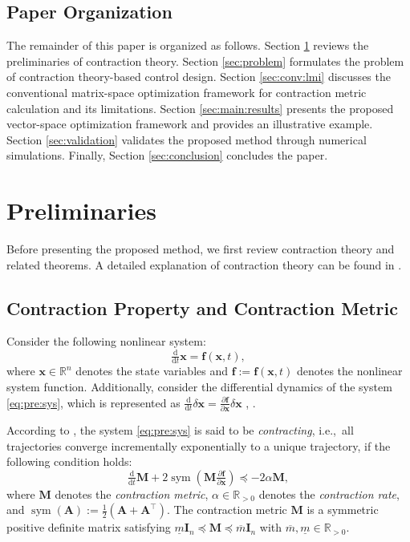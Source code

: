 \documentclass{ifacconf}
\newcommand\ie{\textrm{i.e.,\ }}
\newcommand\R{\mathbb{R}}
\newcommand*{\mv}[1]{\boldsymbol{#1}} %
\newcommand*{\mm}[1]{\boldsymbol{#1}} %
\DeclareMathOperator{\mysym}{{sym}}       %
\newcommand\der{\mathrm d}
\newcommand*{\ddtt}{
   \tfrac{\der}{\der t}
}
\newcommand*{\pptfrac}[2]{
   \tfrac{\partial {#1}}{\partial {#2}}
}
\begin{document}
\subsection{Paper Organization}

The remainder of this paper is organized as follows.
Section \ref{sec:preliminaries} reviews the preliminaries of contraction theory.
Section \ref{sec:problem} formulates the problem of contraction theory-based control design.
Section \ref{sec:conv:lmi} discusses the conventional matrix-space optimization framework for contraction metric calculation and its limitations.
Section \ref{sec:main:results} presents the proposed vector-space optimization framework and provides an illustrative example.
Section \ref{sec:validation} validates the proposed method through numerical simulations.
Finally, Section \ref{sec:conclusion} concludes the paper.

\section{Preliminaries} \label{sec:preliminaries}

Before presenting the proposed method, we first review contraction theory and related theorems.
A detailed explanation of contraction theory can be found in \citep{LOHMILLER:1998aa,Manchester:2017aa,Tsukamoto:2021aa}.

\subsection{Contraction Property and Contraction Metric} \label{sec:sub:contraction}

Consider the following nonlinear system:
\begin{equation} \label{eq:pre:sys}
   \ddtt\mv{x}
   =
   \mv{f}(\mv{x},t)
   ,
\end{equation}
where $\mv{x}\in\R^n$ denotes the state variables and $\mv{f}:=\mv{f}(\mv{x},t)$ denotes the nonlinear system function.
Additionally, consider the differential dynamics of the system \eqref{eq:pre:sys}, which is represented as 
$
   \ddtt{\delta\mv{x}}
   =
   \pptfrac{\mv{f}}{\mv{x}} \delta\mv{x}
$
, \citep[Chap 4]{Kirk:2004aa}.

According to \citep{LOHMILLER:1998aa}, the system \eqref{eq:pre:sys} is said to be \textit{contracting}, \ie all trajectories converge incrementally exponentially to a unique trajectory, if the following condition holds:
\begin{equation} \label{eq:pre:contraction:condition}
   \ddtt\mm{M} 
   + 
   2\mysym
   \left(
      \mm{M} \pptfrac{\mv{f}}{\mv{x}}
   \right) 
   \preceq 
   -2\alpha\mm{M}
   ,
\end{equation}
where $\mm{M}$ denotes the \textit{contraction metric}, $\alpha\in\R_{>0}$ denotes the \textit{contraction rate}, and $\mysym(\mm A):=\tfrac{1}{2}(\mm A+\mm A^\top)$.
The contraction metric $\mm{M}$ is a symmetric positive definite matrix satisfying $\underline{m}\mm{I}_n\preceq\mm{M}\preceq\overline{m}\mm{I}_n$ with $\overline{m},\underline{m}\in\R_{>0}$.
\end{document}

